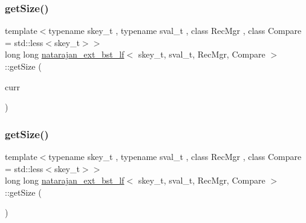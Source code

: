 \mbox{\label{classnatarajan__ext__bst__lf_a71a59c42d573aa3150a7a46d9ca94041}} 
\subsubsection{\texorpdfstring{get\+Size()}{getSize()}\hspace{0.1cm}{\footnotesize\ttfamily [2/4]}}
{\footnotesize\ttfamily template$<$typename skey\+\_\+t , typename sval\+\_\+t , class Rec\+Mgr , class Compare  = std\+::less$<$skey\+\_\+t$>$$>$ \\
long long \hyperlink{classnatarajan__ext__bst__lf}{natarajan\+\_\+ext\+\_\+bst\+\_\+lf}$<$ skey\+\_\+t, sval\+\_\+t, Rec\+Mgr, Compare $>$\+::get\+Size (\begin{DoxyParamCaption}\item[{\hyperlink{structnode__t}{node\+\_\+t}$<$ skey\+\_\+t, sval\+\_\+t $>$ $\ast$}]{curr }\end{DoxyParamCaption})\hspace{0.3cm}{\ttfamily [inline]}}

\mbox{\label{classnatarajan__ext__bst__lf_ac8b9304e8bf0c244a0efb0467a385c23}} 
\subsubsection{\texorpdfstring{get\+Size()}{getSize()}\hspace{0.1cm}{\footnotesize\ttfamily [3/4]}}
{\footnotesize\ttfamily template$<$typename skey\+\_\+t , typename sval\+\_\+t , class Rec\+Mgr , class Compare  = std\+::less$<$skey\+\_\+t$>$$>$ \\
long long \hyperlink{classnatarajan__ext__bst__lf}{natarajan\+\_\+ext\+\_\+bst\+\_\+lf}$<$ skey\+\_\+t, sval\+\_\+t, Rec\+Mgr, Compare $>$\+::get\+Size (\begin{DoxyParamCaption}{ }\end{DoxyParamCaption})\hspace{0.3cm}{\ttfamily [inline]}}

